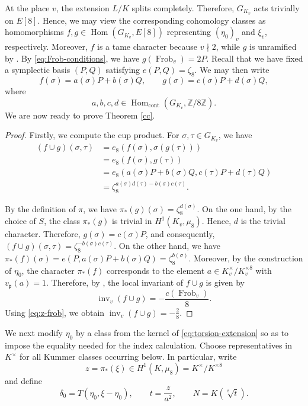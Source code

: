 \documentclass[11pt,a4paper]{amsart}
\theoremstyle{definition}
\numberwithin{equation}{section}
\begin{document}
    At the place $v$, the extension $L/K$ splits completely.
    Therefore, $G_{K_{v}}$ acts trivially on $E[8]$. Hence, we may
    view the corresponding cohomology classes as homomorphisms $
    f,g\in\operatorname{Hom}(G_{K_{v}},E[8])  $
    representing $(\eta_0)_{v}$ and $\xi_{v}$, respectively.  Moreover, $f$ is a tame character because $v\nmid 2$, while $g$ is unramified by
    \cite[Chapter VIII, Proposition 2.1]{Sil}. By \eqref{eq:Frob-conditions}, we have
    $\label{eq:z-frob}
    	g(\operatorname{Frob}_{v})=2P.
    $
Recall that we have fixed a symplectic basis $(P,Q)$ satisfying
$e(P,Q)=\zeta_8$. We may then write
\[
f(\sigma)=a(\sigma)P+b(\sigma)Q,\qquad
g(\sigma)=c(\sigma)P+d(\sigma)Q,
\]
where
\[
a,b,c,d\in
\operatorname{Hom}_{\mathrm{cont}}
(G_{K_{v}},\mathbb Z/8\mathbb Z).
\]
We are now ready to prove  Theorem \ref{cc}.
\begin{proof}
	Firstly, we compute the cup product. For
	$\sigma,\tau\in G_{K_{v}}$, we have
	\begin{align*}
		(f\cup g)(\sigma,\tau)
		&=e_8(f(\sigma),\sigma(g(\tau)))\\
		&=e_8(f(\sigma),g(\tau))\\
		&=e_8(a(\sigma)P+b(\sigma)Q,
		c(\tau)P+d(\tau)Q)\\
		&=\zeta_8^{a(\sigma)d(\tau)-b(\sigma)c(\tau)}.
	\end{align*}
	
	By the definition of $\pi$, we have $	\pi_*(g)(\sigma)=\zeta_8^{d(\sigma)}$.
	On the one hand, by the choice of $S$, the class $\pi_*(g)$ is trivial in
	$H^1(K_{v},\mu_8)$. Hence, $d$ is the trivial character.
	Therefore,	$	g(\sigma)=c(\sigma)P$,
	and consequently, $
	(f\cup g)(\sigma,\tau)
	=
	\zeta_8^{-b(\sigma)c(\tau)}$.
	On the other hand, we have
	$
	\pi_*(f)(\sigma)
	=
	e(P,a(\sigma)P+b(\sigma)Q)
	=
	\zeta_8^{b(\sigma)}.
	$
	Moreover, by the construction of $\eta_0$, the character $\pi_*(f)$
	corresponds to the element $a\in K_{v}^{\times}/K_{v}^{\times 8}$
	with $v_{\mathfrak p}(a)=1$.
	Therefore, by \cite[Chapter XIV, Proposition 3]{Serre}, the local invariant
	of $f\cup g$ is given by
	\[
	\operatorname{inv}_{v}(f\cup g)
	=
	-\frac{c(\operatorname{Frob}_{v})}{8}.
	\]
	Using \eqref{eq:z-frob}, we obtain
$
	\operatorname{inv}_{v}(f\cup g)
	=
	-\frac{2}{8}.
$
\end{proof}


We next modify $\eta_0$ by a class from the kernel of
\eqref{eq:torsion-extension} so as to impose the equality needed for the
index calculation.  Choose representatives in $K^\times$ for all Kummer
classes occurring below.  In particular, write
\[
 z=\pi_*(\xi)\in H^1(K,\mu_8)=K^\times/K^{\times8}
\]
and define
\begin{equation*}\label{eq:defect-t-M}
 \delta_0=T(\eta_0,\xi-\eta_0),
 \qquad
 t=\frac z{a^2},
 \qquad
 N=K(\sqrt[8]{t}).
\end{equation*}
\end{document}
